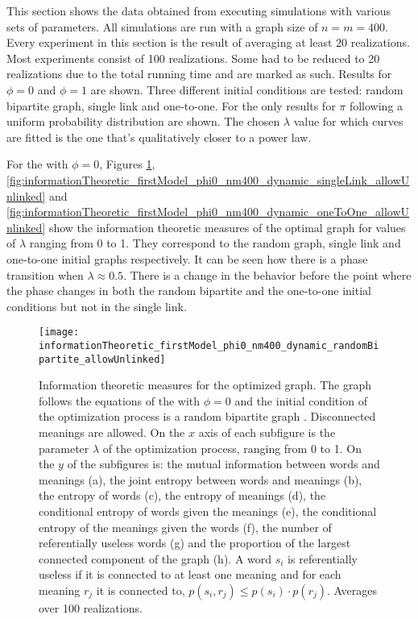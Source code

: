 This section shows the data obtained from executing simulations with various sets of parameters.
All simulations are run with a graph size of $n=m=400$.
Every experiment in this section is the result of averaging at least 20 realizations.
Most experiments consist of 100 realizations.
Some had to be reduced to 20 realizations due to the total running time and are marked as such.
Results for $\phi=0$ and $\phi=1$ are shown.
Three different initial conditions are tested: random bipartite graph, single link and one-to-one.
For the \secondmodel{} only results for $\pi$ following a uniform probability distribution are shown.
The chosen $\lambda$ value for which curves are fitted is the one that's qualitatively closer to a power law.

For the \firstmodel{} with $\phi=0$, Figures \ref{fig:informationTheoretic_firstModel_phi0_nm400_dynamic_randomBipartite_allowUnlinked}, \ref{fig:informationTheoretic_firstModel_phi0_nm400_dynamic_singleLink_allowUnlinked} and \ref{fig:informationTheoretic_firstModel_phi0_nm400_dynamic_oneToOne_allowUnlinked} show the information theoretic measures of the optimal graph for values of $\lambda$ ranging from 0 to 1.
They correspond to the random graph, single link and one-to-one initial graphs respectively. It can be seen how there is a phase transition when $\lambda \approx 0.5$.
There is a change in the behavior before the point where the phase changes in both the random bipartite and the one-to-one initial conditions but not in the single link.

\begin{figure}
  \centering
  \texttt{[image: informationTheoretic\_firstModel\_phi0\_nm400\_dynamic\_randomBipartite\_allowUnlinked]}
  \caption{
    Information theoretic measures for the optimized graph.
    The graph follows the equations of the \firstmodel{} with $\phi=0$ and the initial condition of the optimization process is a random bipartite graph . Disconnected meanings are allowed.
    On the $x$ axis of each subfigure is the parameter $\lambda$ of the optimization process, ranging from 0 to 1.
    On the $y$ of the subfigures is: the mutual information between words and meanings (a), the joint entropy between words and meanings (b), the entropy of words (c), the entropy of meanings (d), the conditional entropy of words given the meanings (e), the conditional entropy of the meanings given the words (f), the number of referentially useless words (g) and the proportion of the largest connected component of the graph (h).
    A word $s_i$ is referentially useless if it is connected to at least one meaning and for each meaning $r_j$ it is connected to, $p(s_i,r_j) \leq p(s_i) \cdot p(r_j)$.
    Averages over 100 realizations.
}
  \label{fig:informationTheoretic_firstModel_phi0_nm400_dynamic_randomBipartite_allowUnlinked}
\end{figure}

